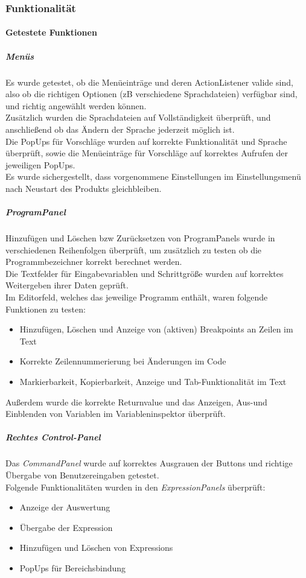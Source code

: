 \documentclass[parskip=full]{scrartcl}
\begin{document}
\subsubsection{Funktionalität}
\paragraph{Getestete Funktionen}
\subparagraph{Menüs}
Es wurde getestet, ob die Menüeinträge und deren ActionListener valide sind, also ob die richtigen Optionen (zB verschiedene Sprachdateien) verfügbar sind, und richtig angewählt werden können.  \\
Zusätzlich wurden die Sprachdateien auf Vollständigkeit überprüft, und anschließend ob das Ändern der Sprache jederzeit möglich ist. \\
Die PopUps für Vorschläge wurden auf korrekte Funktionalität und Sprache überprüft, sowie die Menüeinträge für Vorschläge auf korrektes Aufrufen der jeweiligen PopUps. \\
Es wurde sichergestellt, dass vorgenommene Einstellungen im Einstellungsmenü nach Neustart des Produkts gleichbleiben.
\subparagraph{ProgramPanel}
Hinzufügen und Löschen bzw Zurücksetzen von ProgramPanels wurde in verschiedenen Reihenfolgen überprüft, um zusätzlich zu testen ob die Programmbezeichner korrekt berechnet werden. \\
Die Textfelder für Eingabevariablen und Schrittgröße wurden auf korrektes Weitergeben ihrer Daten geprüft. \\
Im Editorfeld, welches das jeweilige Programm enthält, waren folgende Funktionen zu testen:
\begin{itemize}
\item Hinzufügen, Löschen und Anzeige von (aktiven) Breakpoints an Zeilen im Text
\item Korrekte Zeilennummerierung bei Änderungen im Code
\item Markierbarkeit, Kopierbarkeit, Anzeige und Tab-Funktionalität im Text
\end{itemize}
Außerdem wurde die korrekte Returnvalue und das Anzeigen, Aus-und Einblenden von Variablen im Variableninspektor überprüft.
\subparagraph{Rechtes Control-Panel}
Das \textit{CommandPanel} wurde auf korrektes Ausgrauen der Buttons und richtige Übergabe von Benutzereingaben getestet. \\
Folgende Funktionalitäten wurden in den \textit{ExpressionPanels} überprüft:
\begin{itemize}
\item Anzeige der Auswertung
\item Übergabe der Expression
\item Hinzufügen und Löschen von Expressions
\item PopUps für Bereichsbindung
\end{itemize}
\end{document}
